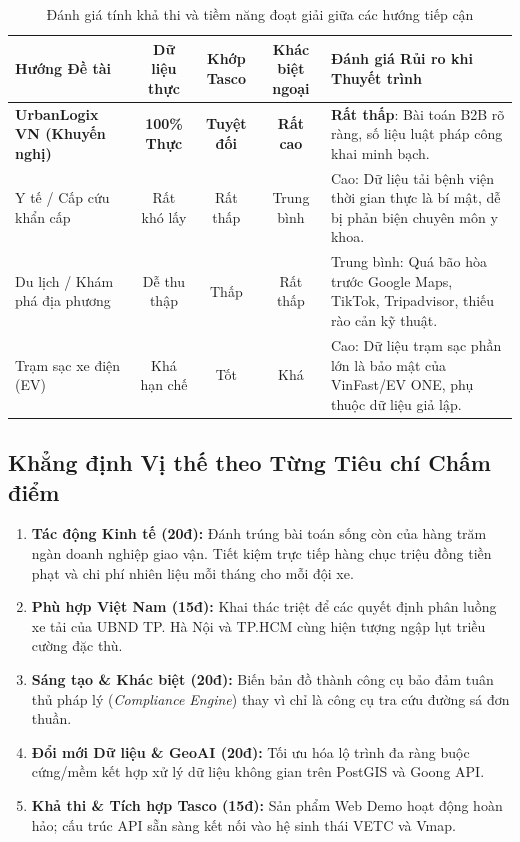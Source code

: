 \documentclass[11pt,a4paper]{article}
\begin{document}
\begin{table}[htbp]
  \centering
  \small
  \caption{Đánh giá tính khả thi và tiềm năng đoạt giải giữa các hướng tiếp cận}
  \label{tab:comparison}
  \begin{tabularx}{\textwidth}{p{3.8cm} c c c Y}
    \toprule
     \color{white}\textbf{Hướng Đề tài} & \color{white}\textbf{Dữ liệu thực} & \color{white}\textbf{Khớp Tasco} & \color{white}\textbf{Khác biệt ngoại} & \color{white}\textbf{Đánh giá Rủi ro khi Thuyết trình} \\
    \midrule
    \textbf{UrbanLogix VN (Khuyến nghị)} & \textbf{100\% Thực} & \textbf{Tuyệt đối} & \textbf{Rất cao} & \textbf{Rất thấp}: Bài toán B2B rõ ràng, số liệu luật pháp công khai minh bạch. \\
    Y tế / Cấp cứu khẩn cấp & Rất khó lấy & Rất thấp & Trung bình & Cao: Dữ liệu tải bệnh viện thời gian thực là bí mật, dễ bị phản biện chuyên môn y khoa. \\
    Du lịch / Khám phá địa phương & Dễ thu thập & Thấp & Rất thấp & Trung bình: Quá bão hòa trước Google Maps, TikTok, Tripadvisor, thiếu rào cản kỹ thuật. \\
    Trạm sạc xe điện (EV) & Khá hạn chế & Tốt & Khá & Cao: Dữ liệu trạm sạc phần lớn là bảo mật của VinFast/EV ONE, phụ thuộc dữ liệu giả lập. \\
    \bottomrule
  \end{tabularx}
\end{table}

\subsection{Khẳng định Vị thế theo Từng Tiêu chí Chấm điểm}
\begin{enumerate}
  \item \textbf{Tác động Kinh tế (20đ):} Đánh trúng bài toán sống còn của hàng trăm ngàn doanh nghiệp giao vận. Tiết kiệm trực tiếp hàng chục triệu đồng tiền phạt và chi phí nhiên liệu mỗi tháng cho mỗi đội xe.
  \item \textbf{Phù hợp Việt Nam (15đ):} Khai thác triệt để các quyết định phân luồng xe tải của UBND TP. Hà Nội và TP.HCM cùng hiện tượng ngập lụt triều cường đặc thù.
  \item \textbf{Sáng tạo \& Khác biệt (20đ):} Biến bản đồ thành công cụ bảo đảm tuân thủ pháp lý (\textit{Compliance Engine}) thay vì chỉ là công cụ tra cứu đường sá đơn thuần.
  \item \textbf{Đổi mới Dữ liệu \& GeoAI (20đ):} Tối ưu hóa lộ trình đa ràng buộc cứng/mềm kết hợp xử lý dữ liệu không gian trên PostGIS và Goong API.
  \item \textbf{Khả thi \& Tích hợp Tasco (15đ):} Sản phẩm Web Demo hoạt động hoàn hảo; cấu trúc API sẵn sàng kết nối vào hệ sinh thái VETC và Vmap.
\end{enumerate}
\end{document}
